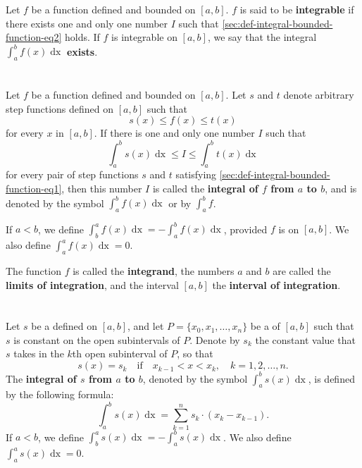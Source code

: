 \documentclass{report}
\begin{document}
Let $f$ be a function defined and bounded on $[a, b]$.
$f$ is said to be \textbf{integrable} if there exists one and only one number
  $I$ such that \eqref{sec:def-integral-bounded-function-eq2} holds.
If $f$ is integrable on $[a, b]$, we say that the integral
  $\int_a^b f(x) \mathop{dx}$ \textbf{exists}.

\section{}%
\label{sec:def-integral-bounded-function}

Let $f$ be a function defined and bounded on $[a, b]$.
Let $s$ and $t$ denote arbitrary step functions defined on $[a, b]$ such that
  \begin{equation}
    \label{sec:def-integral-bounded-function-eq1}
    s(x) \leq f(x) \leq t(x)
  \end{equation}
  for every $x$ in $[a, b]$.
If there is one and only one number $I$ such that
  \begin{equation}
    \label{sec:def-integral-bounded-function-eq2}
    \int_a^b s(x) \mathop{dx} \leq I \leq \int_a^b t(x) \mathop{dx}
  \end{equation}
  for every pair of step functions $s$ and $t$ satisfying
  \eqref{sec:def-integral-bounded-function-eq1}, then this number $I$ is called
  the \textbf{integral of $f$ from $a$ to $b$}, and is denoted by the symbol
  $\int_a^b f(x) \mathop{dx}$ or by $\int_a^b f$.

If $a < b$, we define $\int_b^a f(x) \mathop{dx} = -\int_a^b f(x) \mathop{dx}$,
  provided $f$ is  on $[a, b]$.
We also define $\int_a^a f(x) \mathop{dx} = 0$.

The function $f$ is called the \textbf{integrand}, the numbers $a$ and $b$ are
  called the \textbf{limits of integration}, and the interval $[a, b]$ the
  \textbf{interval of integration}.

\section{}%
\label{sec:def-integral-step-function}

Let $s$ be a  defined on $[a, b]$, and let
  $P = \{x_0, x_1, \ldots, x_n\}$ be a  of $[a, b]$
  such that $s$ is constant on the open subintervals of $P$.
Denote by $s_k$ the constant value that $s$ takes in the $k$th open subinterval
  of $P$, so that
  $$s(x) = s_k \quad\text{if}\quad x_{k-1} < x < x_k, \quad k
         = 1, 2, \ldots, n.$$
The \textbf{integral of $s$ from $a$ to $b$}, denoted by the symbol
  $\int_a^b s(x)\mathop{dx}$, is defined by the following formula:
  $$\int_a^b s(x) \mathop{dx} = \sum_{k=1}^n s_k \cdot (x_k - x_{k-1}).$$
If $a < b$, we define $\int_b^a s(x) \mathop{dx} = -\int_a^b s(x) \mathop{dx}$.
We also define $\int_a^a s(x) \mathop{dx} = 0$.
\end{document}
